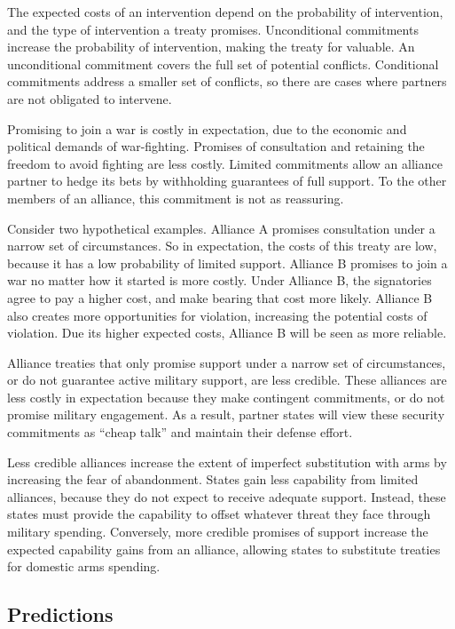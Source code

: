 \documentclass[12pt]{article}
\begin{document}
The expected costs of an intervention depend on the probability of intervention, and the type of intervention a treaty promises. Unconditional commitments increase the probability of intervention, making the treaty for valuable. An unconditional commitment covers the full set of potential conflicts. Conditional commitments address a smaller set of conflicts, so there are cases where partners are not obligated to intervene. 

Promising to join a war is costly in expectation, due to the economic and political demands of war-fighting. Promises of consultation and retaining the freedom to avoid fighting are less costly. Limited commitments allow an alliance partner to hedge its bets by withholding guarantees of full support. To the other members of an alliance, this commitment is not as reassuring.

Consider two hypothetical examples. Alliance A promises consultation under a narrow set of circumstances. So in expectation, the costs of this treaty are low, because it has a low probability of limited support. Alliance B promises to join a war no matter how it started is more costly. Under Alliance B, the signatories agree to pay a higher cost, and make bearing that cost more likely. Alliance B also creates more opportunities for violation, increasing the potential costs of violation. Due its higher expected costs, Alliance B will be seen as more reliable.  

Alliance treaties that only promise support under a narrow set of circumstances, or do not guarantee active military support, are less credible. These alliances are less costly in expectation because they make contingent commitments, or do not promise military engagement. As a result, partner states will view these security commitments as ``cheap talk'' and maintain their defense effort. 

Less credible alliances increase the extent of imperfect substitution with arms by increasing the fear of abandonment. States gain less capability from limited alliances, because they do not expect to receive adequate support. Instead, these states must provide the capability to offset whatever threat they face through military spending. Conversely, more credible promises of support increase the expected capability gains from an alliance, allowing states to substitute treaties for domestic arms spending. 


\subsection*{Predictions}
\end{document}
